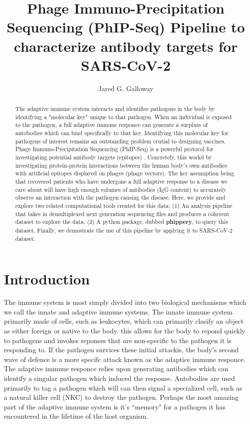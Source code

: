 \documentclass{article}
\title{Phage Immuno-Precipitation Sequencing (PhIP-Seq) Pipeline to characterize antibody targets for SARS-CoV-2}
\author{Jared G. Galloway}
\begin{document}
\maketitle

\begin{abstract}
The adaptive immune system interacts and identifies pathogens in the body by identifying a "molecular key" unique to that pathogen.
When an individual is exposed to the pathogen, a full adaptive immune responce can generate a surpluss of antobodies which can bind specifically to that key.
Identifying this molecular key for pathogens of interest remains an outstanding problem crutial to designing vaccines. 
Phage Immuno-Precipitation Sequencing (PhIP-Seq) is a powerful protocol for investigating potential antibody targets (epitopes) \cite{Larman2011}. 
Concretely, this workd by investigating protein-protein interactions between the human body's own antibodies with artificial epitopes displayed on phages (phage vectors).
The key assumption being that recovered patients who have undergone 
a full adaptive response to a disease we care about will have high enough volumes of antibodies (IgG content) to accurately observe an interaction with the pathogen causing the disease. 
Here, we provide and explore two related computational tools created for this data;
(1) An analysis pipeline that takes in demultiplexed next generation sequencing files and produces a coherent dataset to explore the data.
(2) A python package, dubbed \textbf{phippery}, to query this dataset.
Finally, we demostrate the use of this pipeline by applying it to SARS-CoV-2 dataset.
\end{abstract}

\section*{Introduction}

The immune system is most simply divided into two biological mechanisms which we call the innate and adaptive immune systems.
The innate immune system primarily made of cells, such as leukocytes, which can primarily clasify an object as either foreign or native to the body.
this allows for the body to repond quickly to pathogens and invokes reponses that are non-specific to the pathogen it is responding to.
If the pathogen survices these initial attackis, the body's second wave of defence is a more specifc attack known as the adaptice immune responce.
The adaptive immune responce relies upon generating antibodies which can identify a singular pathogen which induced the response. 
Antobodies are used primarily to tag a pathogen which will can then signal a specialized cell, such as a natural killer cell (NKC) to destroy the pathogen. 
Perhaps the most amazing part of the adaptive immune system is it's ``memory" for a pathogen it has encountered in the lifetime of the host organism.
 
\end{document}
